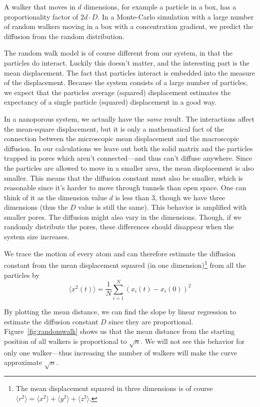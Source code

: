 \documentclass[11pt]{article}
\numberwithin{equation}{section}
\numberwithin{figure}{section}
\newcommand{\ita}[1]{\textit{#1}}
\begin{document}
A walker that moves in $d$ dimensions, for example a particle in a box,
has a proportionality factor of $2 d\cdot D$.
In a Monte-Carlo simulation with a large number of
random walkers moving in a box with a concentration gradient,
we predict the diffusion from the random distribution.

The random walk model is of course different from our system,
in that the particles do interact. Luckily this doesn't matter,
and the interesting part is the mean displacement.
The fact that particles interact is embedded into 
the measure of the displacement.
Because the system consists of a large number of particles,
we expect that the particles average (squared) displacement
estimates the expectancy of a single particle (squared) displacement
in a good way.

In a nanoporous system, we actually have the \ita{same}
result. The interactions affect the mean-square displacement,
but it is only a mathematical fact of the connection
between the microscopic mean displacement and the macroscopic diffusion.
In our calculations we leave out both the solid matrix and
the particles trapped in pores which aren't connected---and thus
can't diffuse anywhere. Since the particles are allowed to move
in a smaller area, the mean displacement is also smaller.
This means that the diffusion constant must also be smaller,
which is reasonable since it's harder to move through tunnels
than open space. One can think of it as the dimension value $d$
is less than 3, though we have three dimensions (thus the
$D$ value is still the same). This behavior is amplified
with smaller pores.
The diffusion might also vary in the dimensions.
Though, if we randomly distribute the pores, these differences should
disappear when the system size increases.

We trace the motion of every atom and can therefore estimate the
diffusion constant from the mean displacement squared 
(in one dimension)\footnote{The mean displacement squared in three
    dimensions is of course
    $\langle r^2 \rangle 
    = \langle x^2 \rangle + \langle y^2 \rangle + \langle z^2 \rangle$.
}
from all the particles by
\begin{equation}
    \langle x^2(t)\rangle 
    = \frac{1}{N}\sum_{i=1}^N {(x_i(t)-x_i(0))}^2
\end{equation}

By plotting the mean distance, we can find the slope by linear regression
to estimate the diffusion constant $D$ since they are proportional. 
Figure~\ref{fig:randomwalk} shows us that the mean distance from the starting
position of all walkers is proportional to 
$\sqrt n$. We will not see this behavior
for only one walker---thus increasing the number of walkers
will make the curve approximate $\sqrt n$.
\end{document}

